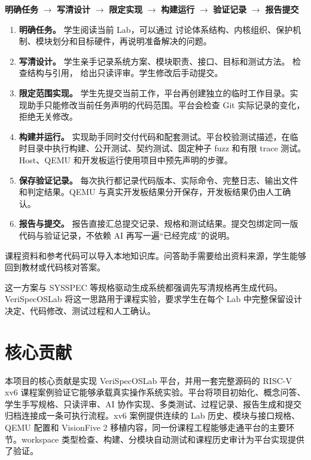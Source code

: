 \begin{center}
\textbf{明确任务} $\rightarrow$ \textbf{写清设计} $\rightarrow$ \textbf{限定实现} $\rightarrow$ \textbf{构建运行} $\rightarrow$ \textbf{验证记录} $\rightarrow$ \textbf{报告提交}
\end{center}

\begin{enumerate}[leftmargin=2.2em,itemsep=0.3em]
  \item \textbf{明确任务。} 学生阅读当前 Lab，可以通过  讨论体系结构、内核组织、保护机制、模块划分和目标硬件，再说明准备解决的问题。
  \item \textbf{写清设计。} 学生亲手记录系统方案、模块职责、接口、目标和测试方法。 检查结构与引用， 给出只读评审。学生修改后手动提交。
  \item \textbf{限定范围实现。} 学生先提交当前工作，平台再创建独立的临时工作目录。实现助手只能修改当前任务声明的代码范围。平台会检查 Git 实际记录的变化，拒绝无关修改。
  \item \textbf{构建并运行。} 实现助手同时交付代码和配套测试。平台校验测试描述，在临时目录中执行构建、公开测试、契约测试、固定种子 fuzz 和有限 trace 测试。Host、QEMU 和开发板运行使用项目中预先声明的步骤。
  \item \textbf{保存验证记录。} 每次执行都记录代码版本、实际命令、完整日志、输出文件和判定结果。QEMU 与真实开发板结果分开保存，开发板结果仍由人工确认。
  \item \textbf{报告与提交。} 报告直接汇总提交记录、规格和测试结果。提交包绑定同一版代码与验证记录，不依赖 AI 再写一遍``已经完成''的说明。
\end{enumerate}

课程资料和参考代码可以导入本地知识库。问答助手需要给出资料来源，学生能够回到教材或代码核对答案。

这一方案与 SYSSPEC 等规格驱动生成系统都强调先写清规格再生成代码\cite{sysspec}。VeriSpecOSLab 将这一思路用于课程实验，要求学生在每个 Lab 中完整保留设计决定、代码修改、测试过程和人工确认。

\section{核心贡献}

本项目的核心贡献是实现 VeriSpecOSLab 平台，并用一套完整源码的 RISC-V xv6 课程案例验证它能够承载真实操作系统实验。平台将项目初始化、概念问答、学生手写规格、只读评审、AI 协作实现、多类测试、过程记录、报告生成和提交归档连接成一条可执行流程。xv6 案例提供连续的 Lab 历史、模块与接口规格、QEMU 配置和 VisionFive 2 移植内容，同一份课程工程能够走通平台的主要环节。workspace 类型检查、构建、分模块自动测试和课程历史审计为平台实现提供了验证。
